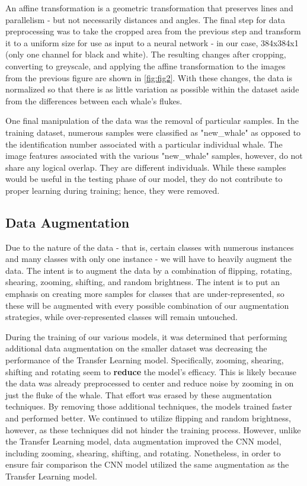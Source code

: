 \documentclass[paper=a4, fontsize=11pt]{scrartcl}
\numberwithin{equation}{section}		%
\numberwithin{table}{section}				%
\begin{document}
An affine transformation is a geometric transformation that preserves lines and parallelism - but not necessarily distances and angles. The final step for data preprocessing was to take the cropped area from the previous step and transform it to a uniform size for use as input to a neural network - in our case, 384x384x1 (only one channel for black and white). The resulting changes after cropping, converting to greyscale, and applying the affine transformation to the images from the previous figure are shown in \autoref{fig:fig2}. With these changes, the data is normalized so that there is as little variation as possible within the dataset aside from the differences between each whale's flukes.

One final manipulation of the data was the removal of particular samples. In the training dataset, numerous samples were classified as "new\_whale" as opposed to the identification number associated with a particular individual whale. The image features associated with the various "new\_whale" samples, however, do not share any logical overlap. They are different individuals. While these samples would be useful in the testing phase of our model, they do not contribute to proper learning during training; hence, they were removed.

\subsection{Data Augmentation}\label{subsec:Augmentation}
Due to the nature of the data - that is, certain classes with numerous instances and many classes with only one instance - we will have to heavily augment the data. The intent is to augment the data by a combination of flipping, rotating, shearing, zooming, shifting, and random brightness. The intent is to put an emphasis on creating more samples for classes that are under-represented, so these will be augmented with every possible combination of our augmentation strategies, while over-represented classes will remain untouched. 

During the training of our various models, it was determined that performing additional data augmentation on the smaller dataset was decreasing the performance of the Transfer Learning model. Specifically, zooming, shearing, shifting and rotating seem to \textbf{reduce} the model's efficacy. This is likely because the data was already preprocessed to center and reduce noise by zooming in on just the fluke of the whale. That effort was erased by these augmentation techniques. By removing those additional techniques, the models trained faster and performed better. We continued to utilize flipping and random brightness, however, as these techniques did not hinder the training process. However, unlike the Transfer Learning model, data augmentation improved the CNN model, including zooming, shearing, shifting, and rotating. Nonetheless, in order to ensure fair comparison the CNN model utilized the same augmentation as the Transfer Learning model.
\end{document}
